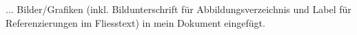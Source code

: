 
... Bilder/Grafiken (inkl. Bildunterschrift für Abbildungsverzeichnis und Label für Referenzierungen im Fliesstext) in mein Dokument eingefügt.
